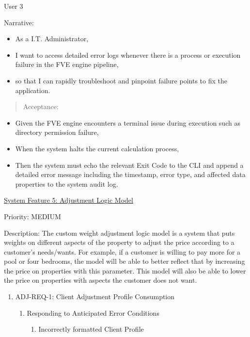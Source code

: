 \documentclass[
]{article}
\begin{document}
User 3

Narrative:

\begin{itemize}
\item
  As a I.T. Administrator,
\item
  I want to access detailed error logs whenever there is a process or
  execution failure in the FVE engine pipeline,
\item
  so that I can rapidly troubleshoot and pinpoint failure points to fix
  the application.
\end{itemize}

\begin{quote}
Acceptance:
\end{quote}

\begin{itemize}
\item
  Given the FVE engine encounters a terminal issue during execution such
  as directory permission failure,
\item
  When the system halts the current calculation process,
\item
  Then the system must echo the relevant Exit Code to the CLI and append
  a detailed error message including the timestamp, error type, and
  affected data properties to the system audit log.
\end{itemize}

\ul{System Feature 5: Adjustment Logic Model}

Priority: MEDIUM

Description: The custom weight adjustment logic model is a system that
puts weights on different aspects of the property to adjust the price
according to a customer's needs/wants. For example, if a customer is
willing to pay more for a pool or four bedrooms, the model will be able
to better reflect that by increasing the price on properties with this
parameter. This model will also be able to lower the price on properties
with aspects the customer does not want.

\begin{enumerate}
\def\labelenumi{\Roman{enumi})}
\item
  ADJ-REQ-1: Client Adjustment Profile Consumption

  \begin{enumerate}
  \def\labelenumii{\alph{enumii}.}
  \item
    Responding to Anticipated Error Conditions

    \begin{enumerate}
    \def\labelenumiii{\roman{enumiii}.}
    \item
      Incorrectly formatted Client Profile
    \end{enumerate}
  \end{enumerate}
\end{enumerate}
\end{document}
